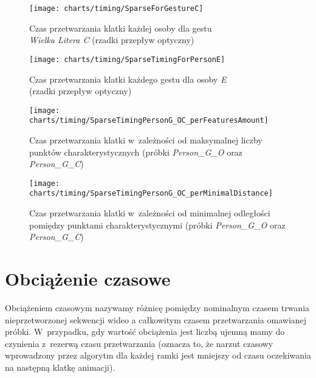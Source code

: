       \begin{figure}[!ht]
        \centering
        \texttt{[image: charts/timing/SparseForGestureC]}
        \caption[Czas przetwarzania klatki każdej osoby dla gestu C (rzadki przepływ optyczny)]
                {Czas przetwarzania klatki każdej osoby dla gestu\\\textit{Wielka Litera C} (rzadki przepływ optyczny)}
        \label{fig:SparseForGestureC}
      \end{figure}

      \begin{figure}[!ht]
        \centering
        \texttt{[image: charts/timing/SparseTimingForPersonE]}
        \caption[Czas przetwarzania klatki każdego gestu dla osoby E (rzadki przepływ optyczny)]
                {Czas przetwarzania klatki każdego gestu dla osoby \textit{E}\\(rzadki przepływ optyczny)}
        \label{fig:SparseTimingForPersonE}
      \end{figure}

    \newpage
      \begin{figure}[!ht]
        \centering
        \texttt{[image: charts/timing/SparseTimingPersonG\_OC\_perFeaturesAmount]}
        \caption[Czas przetwarzania klatki w~zależności od maksymalnej liczby punktów charakterystycznych]
                {Czas przetwarzania klatki w~zależności od maksymalnej liczby punktów charakterystycznych (próbki \textit{Person\_G\_O} oraz \textit{Person\_G\_C})}
        \label{fig:TimingPerFeaturesAmount}
      \end{figure}

      \begin{figure}[!ht]
        \centering
        \texttt{[image: charts/timing/SparseTimingPersonG\_OC\_perMinimalDistance]}
        \caption[Czas przetwarzania klatki w~zależności od minimalnej odległości pomiędzy punktami charakterystycznymi]
                {Czas przetwarzania klatki w~zależności od minimalnej odległości pomiędzy punktami charakterystycznymi (próbki \textit{Person\_G\_O} oraz \textit{Person\_G\_C})}
        \label{fig:TimingPerMinimalDistance}
      \end{figure}

  \section{Obciążenie czasowe}\label{Section_Overhead}
    Obciążeniem czasowym nazywamy różnicę pomiędzy nominalnym czasem trwania nieprzetworzonej sekwencji wideo a całkowitym czasem przetwarzania omawianej próbki. W~przypadku, gdy wartość obciążenia jest liczbą ujemną mamy do czynienia z~rezerwą czasu przetwarzania (oznacza to, że narzut czasowy wprowadzony przez algorytm dla każdej ramki jest mniejszy od czasu oczekiwania na następną klatkę animacji).

